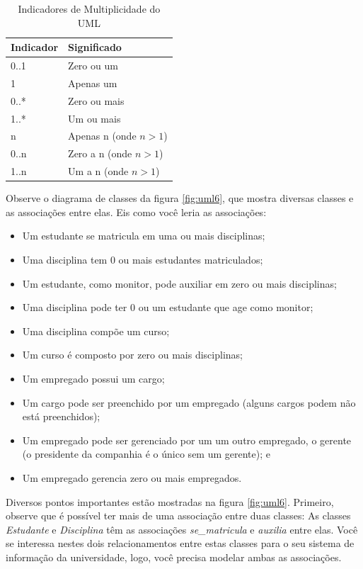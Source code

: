 \begin{table}
\caption{Indicadores de Multiplicidade do UML} \label{tab:uml:mult}
\begin{center}
\begin{tabular}{l l}

\textbf{Indicador} & \textbf{Significado} \\
\hline

0..1 & Zero ou um \\
1 & Apenas um \\
0..* & Zero ou mais \\
1..* & Um ou mais \\
n & Apenas n (onde $n>1$) \\
0..n & Zero a n (onde $n>1$) \\
1..n & Um a n (onde $n>1$)\\
\hline

\end{tabular}
\end{center}
\end{table}

Observe o diagrama de classes da figura \ref{fig:uml6}, que mostra diversas classes e as associações entre elas. Eis como você leria as associações:
\begin{itemize}
\item Um estudante se matricula em uma ou mais disciplinas;
\item Uma disciplina tem 0 ou mais estudantes matriculados;
\item Um estudante, como monitor, pode auxiliar em zero ou mais disciplinas;
\item Uma disciplina pode ter 0 ou um estudante que age como monitor;
\item Uma disciplina compõe um curso;
\item Um curso é composto por zero ou mais disciplinas;
\item Um empregado possui um cargo;
\item Um cargo pode ser preenchido por um empregado (alguns cargos podem não está preenchidos);
\item Um empregado pode ser gerenciado por um um outro empregado, o gerente (o presidente da companhia é o único sem um gerente); e
\item Um empregado gerencia zero ou mais empregados.
\end{itemize}

Diversos pontos importantes estão mostradas na figura \ref{fig:uml6}. Primeiro, observe que é possível ter mais de uma associação entre duas classes: As classes \emph{Estudante} e \emph{Disciplina} têm as associações \emph{se\_matricula} e \emph{auxilia} entre elas. Você se interessa nestes dois relacionamentos entre estas classes para o seu sistema de informação da universidade, logo, você precisa modelar ambas as associações.


